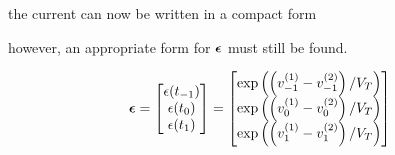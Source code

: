 \documentclass[12pt,journal,compsoc]{../ieeepaper/IEEEtran}
\begin{document}
the current can now be written in a compact form


however, an appropriate form for \( \boldsymbol{\epsilon} \) must still be found.

\begin{equation}\label{eqn:ece1254projectReport:980}
\begin{aligned}
\Bepsilon &= 
\begin{bmatrix}
\epsilon(t_{-1}) \\
\epsilon(t_{0}) \\
\epsilon(t_{1}) \\
\end{bmatrix}
=
\begin{bmatrix}
\exp\lr{ \lr{ v^{(1)}_{-1} - v^{(2)}_{-1} }/V_T } \\
\exp\lr{ \lr{ v^{(1)}_{0} - v^{(2)}_{0} }/V_T } \\
\exp\lr{ \lr{ v^{(1)}_{1} - v^{(2)}_{1} }/V_T }
\end{bmatrix} \\
\end{aligned}
\end{equation}
\end{document}
